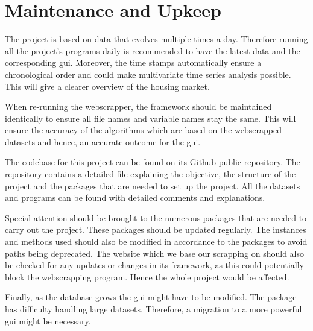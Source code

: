 \documentclass[main]{subfiles}
\begin{document}
\section{Maintenance and Upkeep}

The project is based on data that evolves multiple times a day. 
Therefore running all the project's programs daily is recommended to have the latest data and the corresponding \ac{gui}. 
Moreover, the time stamps automatically ensure a chronological order and could make multivariate time series analysis possible.
This will give a clearer overview of the housing market. \par
When re-running the webscrapper, the framework should be maintained identically to ensure all file names and variable names stay the same. 
This will ensure the accuracy of the algorithms which are based on the webscrapped datasets and hence, an accurate outcome for the \ac{gui}. \par
The codebase for this project can be found on its Github public repository. 
The repository contains a detailed \pkg[readme.md] file explaining the objective, 
the structure of the project and the packages that are needed to set up the project. 
All the datasets and programs can be found with detailed comments and explanations.\par
Special attention should be brought to the numerous packages that are needed to carry out the project. 
These packages should be updated regularly. 
The instances and methods used should also be modified in accordance to the packages to avoid paths being deprecated.
The website which we base our scrapping on should also be checked for any updates or changes in its framework, 
as this could potentially block the webscrapping program. Hence the whole project would be affected.\par
Finally, as the database grows the \ac{gui} might have to be modified. 
The \pkg[tkinter] package has difficulty handling large datasets.
Therefore, a migration to a more powerful \ac{gui} might be necessary.
\end{document}
